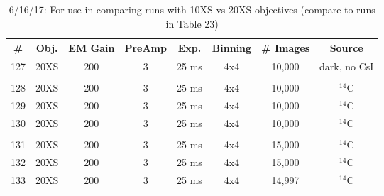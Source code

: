 \documentclass[12pt]{amsart}
\begin{document}
\begin{table}[!htbp]
	\centering
	\caption{6/16/17: For use in comparing runs with 10XS vs 20XS objectives
		(compare to runs in Table 23)}
	\label{tab:table24}
	\hspace*{-1cm}
	\begin{tabular}{cccccccc}
	\toprule
	\# & Obj. & EM Gain & PreAmp & Exp. & Binning & \# Images & Source\\
	\midrule
	127 & 20XS & 200 & 3 & 25 ms & 4x4 & 10,000 & dark, no CsI\\
	 & \\
	128 & 20XS & 200 & 3 & 25 ms & 4x4 & 10,000 & $^{14}$C\\
	129 & 20XS & 200 & 3 & 25 ms & 4x4 & 10,000 & $^{14}$C\\
	130 & 20XS & 200 & 3 & 25 ms & 4x4 & 10,000 & $^{14}$C\\
	 &  \\
	131 & 20XS & 200 & 3 & 25 ms & 4x4 & 15,000 & $^{14}$C\\
	132 & 20XS & 200 & 3 & 25 ms & 4x4 & 15,000 & $^{14}$C\\
	133 & 20XS & 200 & 3 & 25 ms & 4x4 & 14,997 & $^{14}$C\\
	\bottomrule
	\end{tabular}
	\hspace*{-1cm}
\end{table}
\end{document}
